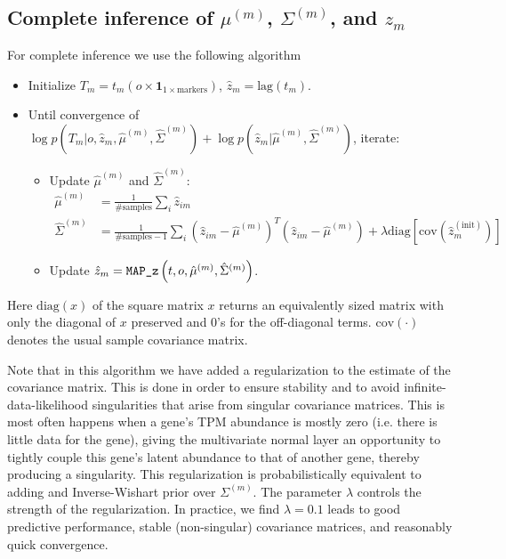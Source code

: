 \documentclass[10pt]{article}
\begin{document}
\subsection{Complete inference of $\mu^{(m)}$, $\Sigma^{(m)}$, and $z_m$}

For complete inference we use the following algorithm
\begin{itemize}
\item Initialize $T_m = t_m(o \times \textbf{1}_{1 \times \textrm{markers}} )$, $\hat{z}_m = \textrm{lag}(t_m)$.
\item Until convergence of $\log p(T_m | o, \hat{z}_m, \hat{\mu}^{(m)}, \hat{\Sigma}^{(m)}) + \log p(\hat{z}_m| \hat{\mu}^{(m)}, \hat{\Sigma}^{(m)})$, iterate:
\begin{itemize}
\item Update $\hat{\mu}^{(m)}$ and $\hat{\Sigma}^{(m)}$:
\begin{align*}
\hat{\mu}^{(m)} & = \frac{1}{\#\textrm{samples}} \sum_i \hat{z}_{im} \\
\hat{\Sigma}^{(m)} & = \frac{1}{\#\textrm{samples} - 1} \sum_i (\hat{z}_{im} - \hat{\mu}^{(m)})^T(\hat{z}_{im} - \hat{\mu}^{(m)}) + \lambda\textrm{diag}\left[\textrm{cov}\left(\hat{z}_m^{(\textrm{init})} \right) \right]
\end{align*}
\item Update  $\hat{z}_m = \verb|MAP_z| \left(t, o, \hat{\mu}^{(m)}, \hat{\Sigma}^{(m)} \right)$.
\end{itemize}
\end{itemize}
Here $\textrm{diag}(x)$ of the square matrix $x$ returns an equivalently sized matrix with only the diagonal of $x$ preserved and 0's for the off-diagonal terms. $\textrm{cov}(\cdot)$ denotes the usual sample covariance matrix.

Note that in this algorithm we have added a regularization to the estimate of the covariance matrix. This is done in order to ensure stability and to avoid infinite-data-likelihood singularities that arise from singular covariance matrices. This is most often happens when a gene’s TPM abundance is mostly zero (i.e. there is little data for the gene), giving the multivariate normal layer an opportunity to tightly couple this gene’s latent abundance to that of another gene, thereby producing a singularity. This regularization is probabilistically equivalent to adding and Inverse-Wishart prior over $\Sigma^{(m)}$. The parameter $\lambda$ controls the strength of the regularization. In practice, we find $\lambda = 0.1$ leads to good predictive performance, stable (non-singular) covariance matrices, and reasonably quick convergence.
\end{document}
